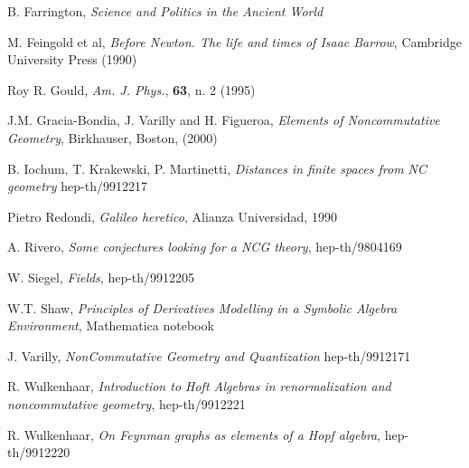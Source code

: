 \documentclass[a4paper,10pt]{article}
\begin{document}
\begin{thebibliography}{25}
 B. Farrington, {\it Science and Politics in  the
Ancient World} 

 M. Feingold et al, {\it Before Newton. The life and
times of Isaac Barrow}, Cambridge University Press (1990)

 Roy R. Gould, {\it Am. J. Phys.}, {\bf 63}, n. 2 (1995)

 J.M. Gracia-Bondia, J. Varilly and H. Figueroa, {\it Elements
of Noncommutative Geometry}, Birkhauser, Boston, (2000)

 B. Iochum, T. Krakewski, P. Martinetti,
{\it Distances in finite spaces from NC geometry} hep-th/9912217 

 Pietro Redondi, {\it Galileo heretico}, Alianza 
Universidad, 1990

 A. Rivero, {\it Some conjectures looking for a NCG theory},
 hep-th/9804169 

 W. Siegel, {\it Fields}, hep-th/9912205

 W.T. Shaw, {\it Principles of Derivatives Modelling in a 
Symbolic Algebra Environment}, {Mathematica notebook} 

 J. Varilly, {\it NonCommutative Geometry and Quantization}
hep-th/9912171

 R. Wulkenhaar, {\it Introduction to Hoft Algebras in
renormalization and noncommutative geometry}, hep-th/9912221

 R. Wulkenhaar, {\it On Feynman graphs as elements of a
Hopf algebra}, hep-th/9912220

\end{thebibliography}
\end{document}
